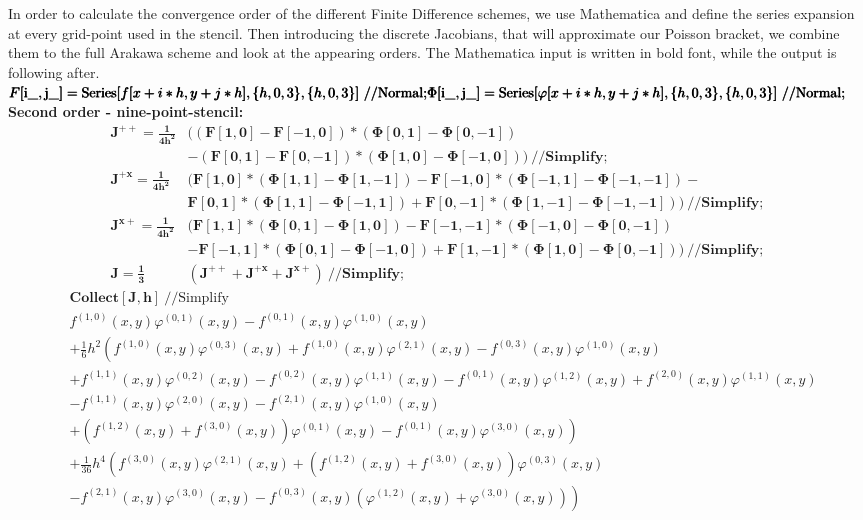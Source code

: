 In order to calculate the convergence order of the different Finite Difference schemes, we use Mathematica and define the series expansion at every grid-point used in the stencil. Then introducing the discrete Jacobians, that will approximate our Poisson bracket, we combine them to the full Arakawa scheme and look at the appearing orders. The Mathematica input is written in bold font, while the output is following after. \\ 

\noindent\(	\pmb{F[\text{i$\_$}, \text{j$\_$}] = \text{Series}[f[x+i*h,y+j*h], \{h,0, 3\}, \{h,0, 3\}] \ \text{//}\text{Normal};}\\
	\pmb{\Phi[\text{i$\_$}, \text{j$\_$}] = \text{Series}[\varphi[x+i*h,y+j*h], \{h,0, 3\}, \{h,0, 3\}] \ \text{//}\text{Normal};} \)
\textbf{Second order - nine-point-stencil:}\\
\begin{align*}
	\pmb{J^{++} = }
	\pmb{ \frac{1}{4 h^2}}
	&\pmb{( (F[1, 0] - F[-1, 0])*(\Phi[0,1]-\Phi[0,-1]) } \\
	&\pmb{- (F[0,1]-F[0,-1])*(\Phi[1,0]-\Phi[-1,0])) \ \text{//}\text{Simplify}};\\
%
	\pmb{J^{+x} = }
	\pmb{ \frac{1}{4 h^2}}
	&\pmb{( F[1,0]*(\Phi[1,1] - \Phi[1,-1])-F[-1, 0]*(\Phi[-1, 1]- \Phi[-1, -1]) - }\\
	&\pmb{F[0, 1]*(\Phi[1, 1] - \Phi[-1, 1]) + }
	\pmb{F[0, -1]*(\Phi[1, -1]-\Phi[-1,-1])) \ \text{//}\text{Simplify}}; \\
%
	\pmb{J^{x+} = }
	\pmb{ \frac{1}{4 h^2}}
	&\pmb{(F[1,1]*(\Phi[0,1]-\Phi[1,0])-F[-1,-1]*(\Phi[-1,0]-\Phi[0,-1]) }\\
	&-\pmb{F[-1,1]*(\Phi[0,1]-\Phi[-1,0])+F[1,-1]*(\Phi[1,0]-\Phi[0,-1])) \ \text{//}} \pmb{\text{Simplify}};\\
%
	\pmb{ J = \frac{1}{3}} & \pmb{(J^{++} + J^{+x} + J^{x+}) \ \text{//}\text{Simplify}};
\end{align*}
\begin{align*}
&\pmb{	\text{Collect}[J,h] } \ \text{//}\text{Simplify} \\
 &f^{(1,0)}(x,y) \varphi^{(0,1)}(x,y)-f^{(0,1)}(x,y) \varphi^{(1,0)}(x,y) \\
 &+\frac{1}{6} h^2 \left(f^{(1,0)}(x,y) \varphi^{(0,3)}(x,y)+f^{(1,0)}(x,y) \varphi^{(2,1)}(x,y)-f^{(0,3)}(x,y) \varphi^{(1,0)}(x,y) \right.\\
   &+f^{(1,1)}(x,y) \varphi^{(0,2)}(x,y)-f^{(0,2)}(x,y) \varphi^{(1,1)}(x,y)-f^{(0,1)}(x,y) \varphi^{(1,2)}(x,y)+f^{(2,0)}(x,y) \varphi^{(1,1)}(x,y)\\
   &-f^{(1,1)}(x,y) \varphi^{(2,0)}(x,y)-f^{(2,1)}(x,y)\varphi^{(1,0)}(x,y)\\
   &+\left.\left(f^{(1,2)}(x,y)+f^{(3,0)}(x,y)\right) \varphi^{(0,1)}(x,y)-f^{(0,1)}(x,y) \varphi^{(3,0)}(x,y)\right)\\
   &+ \frac{1}{36} h^4 \left(f^{(3,0)}(x,y) \varphi^{(2,1)}(x,y)+\left(f^{(1,2)}(x,y)+f^{(3,0)}(x,y)\right) \varphi^{(0,3)}(x,y) \right.\\
   &-\left.f^{(2,1)}(x,y) \varphi^{(3,0)}(x,y)-f^{(0,3)}(x,y) \left(\varphi^{(1,2)}(x,y)+\varphi^{(3,0)}(x,y)\right)\right)
\end{align*}

